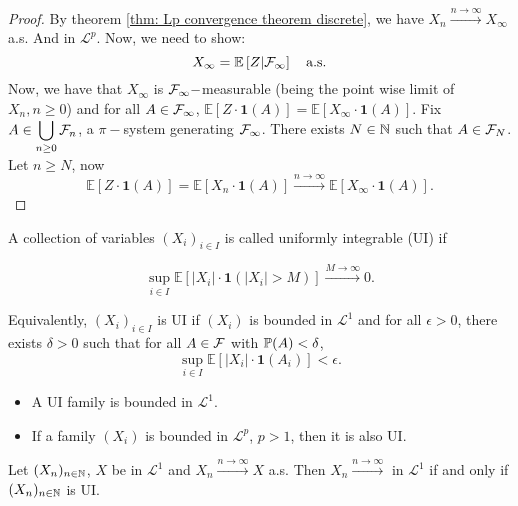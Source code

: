 \documentclass{article}
\begin{document}
\begin{proof}
By theorem \ref{thm: Lp convergence theorem discrete}, we have $ X_{n}\stackrel{n\to \infty}{\longrightarrow}X_{\infty}$ a.s. And in $ \mathcal{L}^{p} $. Now, we need to show:
	\[
	X_{\infty} = \mathbb{E}\left[ Z|\mathcal{F}_{\infty} \right]\quad \text{a.s.}
	\]
Now, we have that $ X_{\infty}$ is $ \mathcal{F}_{\infty}-$measurable (being the point wise limit of $ X_{n}, n\geq 0$) and for all $ A\in \mathcal{F}_{\infty}$, $ \mathbb{E}\left[ Z\cdot \mathbf{1}(A) \right] = \mathbb{E}\left[ X_{\infty}\cdot \mathbf{1}(A) \right]$. Fix $ A\in\displaystyle\bigcup_{n\geq 0}\mathcal{F}_{n} $, a $ \pi-$system generating $ \mathcal{F}_{\infty}$. There exists $ N\in \mathbb{N}$ such that $ A\in \mathcal{F}_{N}$. Let $ n\geq N$, now 
\[
	\mathbb{E}\left[ Z\cdot \mathbf{1}(A) \right] = \mathbb{E}\left[ X_{n}\cdot \mathbf{1}(A) \right]\stackrel{n\to \infty}{\longrightarrow} \mathbb{E}\left[ X_{\infty}\cdot \mathbf{1}(A) \right].
\]
\end{proof}

\begin{boxdef}\label{def: UI}
A collection of variables $ (X_{i})_{i\in I}$ is called uniformly integrable (UI) if 

\[
	\displaystyle\sup_{i\in I} \mathbb{E}\left[ |X_{i}|\cdot \mathbf{1}(|X_{i}|> M) \right]\stackrel{M\to \infty}{\longrightarrow}0.
\]
\end{boxdef}

Equivalently, $ (X_{i})_{i\in I}$ is UI if $ (X_{i})$ is bounded in $ \mathcal{L}^{1} $ and for all $ \epsilon>0$, there exists $ \delta >0$ such that for all $ A\in \mathcal{F}$ with $ \mathbb{P}(A)<\delta$, 
\[
	\displaystyle\sup_{i\in I} \mathbb{E}\left[ |X_{i}|\cdot \mathbf{1}(A_{i}) \right]<\epsilon.
\]
\begin{itemize}
	\item A UI family is bounded in $ \mathcal{L}^{1} $. 
	\item If a family $ (X_{i})$ is bounded in $ \mathcal{L}^{p} $, $ p>1$, then it is also UI.
\end{itemize}

\begin{boxlemma}\label{lemma: UI a.s. conv}
	Let $ (X_{n})_{n\in \mathbb{N}}$, $ X$ be in $ \mathcal{L}^{1} $ and $ X_{n}\stackrel{n\to \infty}{\longrightarrow}X$ a.s. Then $ X_{n}\stackrel{n\to \infty}{\longrightarrow}$ in $ \mathcal{L}^{1} $ if and only if $ (X_{n})_{n\in \mathbb{N}}$ is UI.
\end{boxlemma}
\end{document}
